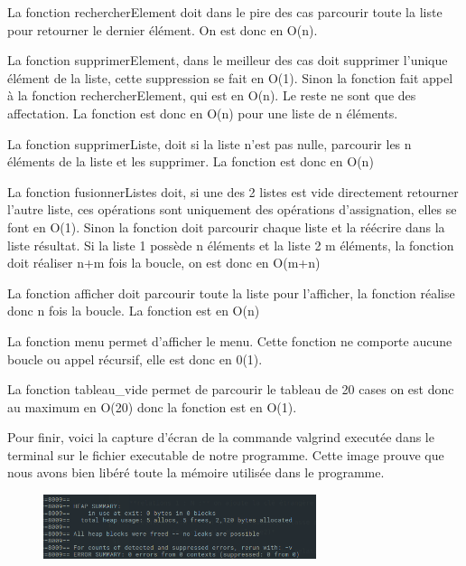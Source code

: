 \documentclass[11pt]{report}
\begin{document}
\medskip

La fonction rechercherElement doit dans le pire des cas parcourir toute la liste pour retourner le dernier élément. On est donc en O(n).

\medskip

La fonction supprimerElement, dans le meilleur des cas doit supprimer l'unique élément de la liste, cette suppression se fait en O(1). Sinon la fonction fait appel à la fonction rechercherElement, qui est en O(n). Le reste ne sont que des affectation. La fonction est donc en O(n) pour une liste de n éléments.

\medskip

La fonction supprimerListe, doit si la liste n'est pas nulle, parcourir les n éléments de la liste et les supprimer. La fonction est donc en O(n) 

\medskip

La fonction fusionnerListes doit, si une des 2 listes est vide directement retourner l'autre liste, ces opérations sont uniquement des opérations d’assignation, elles se font en O(1). Sinon la fonction doit parcourir chaque liste et la réécrire dans la liste résultat. Si la liste 1 possède n éléments et la liste 2 m éléments, la fonction doit réaliser n+m fois la boucle, on est donc en O(m+n)

\medskip

La fonction afficher doit parcourir toute la liste pour l'afficher, la fonction réalise donc n fois la boucle. La fonction est en O(n)

\medskip

La fonction menu permet d'afficher le menu. Cette fonction ne comporte aucune boucle ou appel récursif, elle est donc en 0(1).

\medskip

La fonction tableau\_vide permet de parcourir le tableau de 20 cases on est donc au maximum en O(20) donc la fonction est en O(1).

\medskip

Pour finir, voici la capture d'écran de la commande valgrind executée dans le terminal sur le fichier executable de notre programme. Cette image prouve que nous avons bien libéré toute la mémoire utilisée dans le programme.

\begin{figure}[h]
\includegraphics[width=8cm]{leak_summary.png}
\end{figure}
\end{document}
